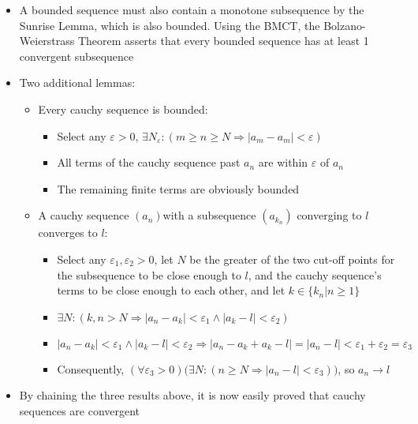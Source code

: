 \documentclass[10pt, oneside]{article}
\let\geq\geqslant
\begin{document}
\begin{itemize}
\begin{itemize}
\begin{itemize}
        \end{itemize}
        \item A bounded sequence must also contain a monotone subsequence by the Sunrise Lemma, which is also bounded. Using the BMCT, the Bolzano-Weierstrass Theorem asserts that every bounded sequence has at least 1 convergent subsequence
        \item Two additional lemmas:
        \begin{itemize}
            \item Every cauchy sequence is bounded:
            \begin{itemize}
                \item Select any $\varepsilon > 0$, $\exists N_\varepsilon : (m \geq n \geq N  \Rightarrow |a_m - a_m| < \varepsilon)$
                \item All terms of the cauchy sequence past $a_n$ are within $\varepsilon$ of $a_n$
                \item The remaining finite terms are obviously bounded
            \end{itemize}
            \item A cauchy sequence $(a_n)$with a subsequence $(a_{k_n})$ converging to $l$ converges to $l$:
            \begin{itemize}
                \item Select any $\varepsilon_1, \varepsilon_2 > 0$, let $N$ be the greater of the two cut-off points for the subsequence to be close enough to $l$, and the cauchy sequence's terms to be close enough to each other, and let $k \in \{k_n | n \geq 1\}$
                \item $ \exists N : (k,n > N \Rightarrow | a_n - a_k | < \varepsilon_1 \land | a_k - l | < \varepsilon_2 )$
                \item $|a_n - a_k| < \varepsilon_1 \land |a_k - l| < \varepsilon_2 \Rightarrow |a_n - a_k + a_k - l| = |a_n - l| < \varepsilon_1 + \varepsilon_2 = \varepsilon_3 $
                \item Consequently, $(\forall \varepsilon_3 > 0) \big(\exists N : ( n \geq N \Rightarrow |a_n - l| < \varepsilon_3) \big)$, so $a_n \rightarrow l$
            \end{itemize}
        \end{itemize}
        \item By chaining the three results above, it is now easily proved that cauchy sequences are convergent
    \end{itemize}
\end{itemize}
\end{document}
